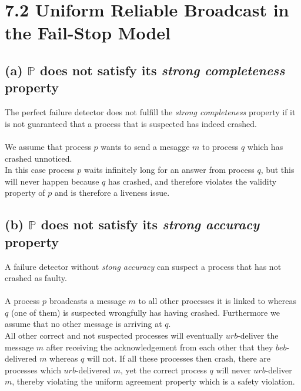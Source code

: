 \documentclass{article}
\begin{document}
	\section*{7.2 Uniform Reliable Broadcast in the Fail-Stop Model}
	\begin{adjustwidth}{2em}{2em}
		\subsection*{(a) $\mathbb{P}$ does not satisfy its \textit{strong completeness} property}
		\begin{adjustwidth}{2em}{2em}
			The perfect failure detector does not fulfill the \textit{strong completeness} property if it is not guaranteed that a process that is suspected has indeed crashed. \\ \\
			We assume that process $p$ wants to send a mesagge $m$ to process $q$ which has crashed unnoticed. \\
			In this case process $p$ waits infinitely long for an answer from process $q$, but this will never happen because $q$ has crashed, and therefore violates the validity property of $p$ and is therefore a liveness issue.
		\end{adjustwidth}
		\subsection*{(b) $\mathbb{P}$ does not satisfy its \textit{strong accuracy} property}
		\begin{adjustwidth}{2em}{2em}
			A failure detector without \textit{stong accuracy} can suspect a process that has not crashed as faulty. \\ \\
			A process $p$ broadcasts a message $m$ to all other processes it is linked to whereas $q$ (one of them) is suspected wrongfully has having crashed. Furthermore we assume that no other message is arriving at $q$. \\
			All other correct and not suspected processes will eventually $urb$-deliver the message $m$ after receiving the acknowledgement from each other that they $beb$-delivered $m$ whereas $q$ will not. If all these processes then crash, there are processes which $urb$-delivered $m$, yet the correct process $q$ will never $urb$-deliver $m$, thereby violating the uniform agreement property which is a safety violation.
		\end{adjustwidth}
	\end{adjustwidth}
	
\end{document}
